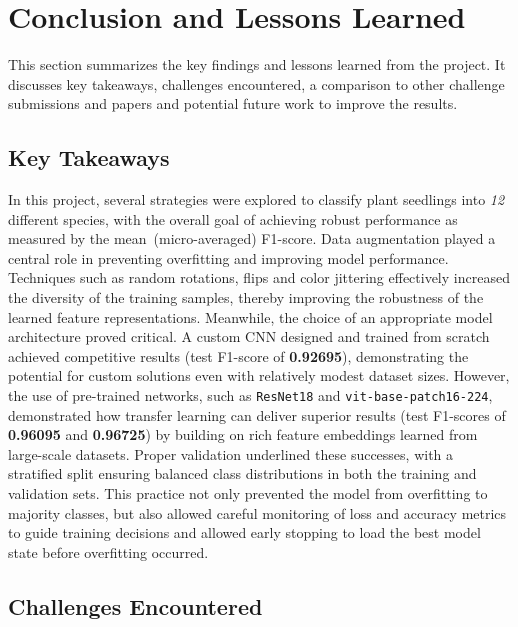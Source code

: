\section{Conclusion and Lessons Learned}

This section summarizes the key findings and lessons learned from the project. It discusses key takeaways, challenges encountered, a comparison to other challenge submissions and papers and potential future work to improve the results.

\subsection{Key Takeaways}

In this project, several strategies were explored to classify plant seedlings into \textit{12} different species, with the overall goal of achieving robust performance as measured by the mean~(micro-averaged) F1-score. Data augmentation played a central role in preventing overfitting and improving model performance. Techniques such as random rotations, flips and color jittering effectively increased the diversity of the training samples, thereby improving the robustness of the learned feature representations. Meanwhile, the choice of an appropriate model architecture proved critical. A custom CNN designed and trained from scratch achieved competitive results (test F1-score of \textbf{0.92695}), demonstrating the potential for custom solutions even with relatively modest dataset sizes. However, the use of pre-trained networks, such as \texttt{ResNet18} and \texttt{vit-base-patch16-224}, demonstrated how transfer learning can deliver superior results (test F1-scores of \textbf{0.96095} and \textbf{0.96725}) by building on rich feature embeddings learned from large-scale datasets. Proper validation underlined these successes, with a stratified split ensuring balanced class distributions in both the training and validation sets. This practice not only prevented the model from overfitting to majority classes, but also allowed careful monitoring of loss and accuracy metrics to guide training decisions and allowed early stopping to load the best model state before overfitting occurred.

\subsection{Challenges Encountered}

